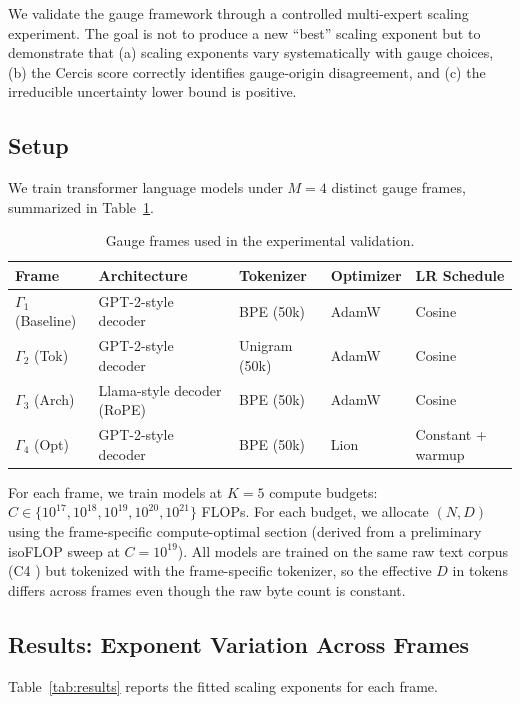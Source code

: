 \documentclass[12pt,a4paper]{article}
\theoremstyle{remark}
\begin{document}
We validate the gauge framework through a controlled multi-expert scaling experiment. The goal is not to produce a new ``best'' scaling exponent but to demonstrate that (a) scaling exponents vary systematically with gauge choices, (b) the Cercis score correctly identifies gauge-origin disagreement, and (c) the irreducible uncertainty lower bound is positive.

\subsection{Setup}

We train transformer language models under $M = 4$ distinct gauge frames, summarized in Table~\ref{tab:frames}.

\begin{table}[H]
\centering
\caption{Gauge frames used in the experimental validation.}
\label{tab:frames}
\begin{tabular}{@{}lllll@{}}
\toprule
\textbf{Frame} & \textbf{Architecture} & \textbf{Tokenizer} & \textbf{Optimizer} & \textbf{LR Schedule} \\
\midrule
$\Gamma_1$ (Baseline) & GPT-2-style decoder & BPE (50k) & AdamW & Cosine \\
$\Gamma_2$ (Tok) & GPT-2-style decoder & Unigram (50k) & AdamW & Cosine \\
$\Gamma_3$ (Arch) & Llama-style decoder (RoPE) & BPE (50k) & AdamW & Cosine \\
$\Gamma_4$ (Opt) & GPT-2-style decoder & BPE (50k) & Lion & Constant + warmup \\
\bottomrule
\end{tabular}
\end{table}

For each frame, we train models at $K = 5$ compute budgets: $C \in \{10^{17}, 10^{18}, 10^{19}, 10^{20}, 10^{21}\}$ FLOPs. For each budget, we allocate $(N, D)$ using the frame-specific compute-optimal section (derived from a preliminary isoFLOP sweep at $C = 10^{19}$). All models are trained on the same raw text corpus (C4 \cite{raffel2020}) but tokenized with the frame-specific tokenizer, so the effective $D$ in tokens differs across frames even though the raw byte count is constant.

\subsection{Results: Exponent Variation Across Frames}

Table~\ref{tab:results} reports the fitted scaling exponents for each frame.
\end{document}
